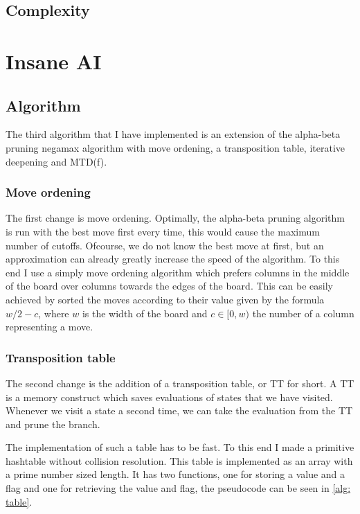 \documentclass[a4paper]{article}
\begin{document}
\subsection{Complexity}

\section{Insane AI}

\subsection{Algorithm}
The third algorithm that I have implemented is an extension of the alpha-beta
pruning negamax algorithm with move ordening, a transposition table, iterative
deepening and MTD(f).

\subsubsection*{Move ordening}
The first change is move ordening. Optimally, the alpha-beta pruning algorithm
is run with the best move first every time, this would cause the maximum number
of cutoffs. Ofcourse, we do not know the best move at first, but an
approximation can already greatly increase the speed of the algorithm. To this
end I use a simply move ordening algorithm which prefers columns in the middle
of the board over columns towards the edges of the board. This can be easily
achieved by sorted the moves according to their value given by the formula $w /
2 - c$, where $w$ is the width of the board and $c \in [0, w)$ the number of a
column representing a move.

\subsubsection*{Transposition table}
The second change is the addition of a transposition table, or TT for short. A
TT is a memory construct which saves evaluations of states that we have
visited. Whenever we visit a state a second time, we can take the evaluation
from the TT and prune the branch.

The implementation of such a table has to be fast. To this end I made a
primitive hashtable without collision resolution. This table is implemented as
an array with a prime number sized length. It has two functions, one for
storing a value and a flag and one for retrieving the value and flag, the
pseudocode can be seen in \ref{alg: table}.
\end{document}
